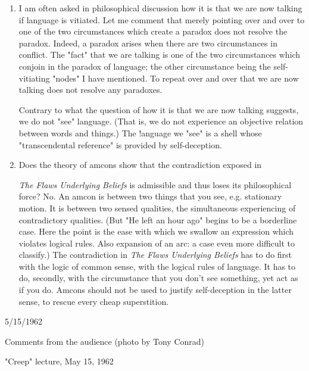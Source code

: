 \documentclass[10pt,twoside,draft]{memoir}
\newcommand{\essaytitle}[1]{
	\emph{#1}}
\begin{document}
\begin{enumerate}
At first this suggestion may seem like another joke, a triviality. But my 
genius consists in recognizing that it is not, that there is a residue of 
non-vacuity and non-triviality in this proposal. There may be only a 
hair's-breadth of difference between the state I propose and mental 
incompetance or death---but still, there is all of a hair's-breadth. I magnify 
this hair's-breadth many times, and use it as a lever to overturn civilization. 

\item I am often asked in philosophical discussion how it is that we are 
now talking if language is vitiated. Let me comment that merely pointing 
over and over to one of the two circumstances which create a paradox does 
not resolve the paradox. Indeed, a paradox arises when there are two 
circumstances in conflict. The "fact" that we are talking is one of the two 
circumstances which conjoin in the paradox of language; the other 
circumstance being the self-vitiating "nodes" I have mentioned. To repeat 
over and over that we are now talking does not resolve any paradoxes. 

Contrary to what the question of how it is that we are now talking 
suggests, we do not "see" language. (That is, we do not experience an 
objective relation between words and things.) The !anguage we "see" is a 
shell whose "transcendental reference" is provided by self-deception. 

\item Does the theory of amcons show that the contradiction exposed in 
\essaytitle{The Flaws Underlying Beliefs} is admissible and thus loses its philosophical 
force? No. An amcon is between two things that you see, e.g. stationary 
motion. It is between two sensed qualities, the simultaneous experiencing of 
contradictory qualities. (But "He left an hour ago" begins to be a borderline 
case. Here the point is the ease with which we swallow an expression which 
violates logical rules. Also expansion of an arc: a case even more difficult to 
classify.) The contradiction in \essaytitle{The Flaws Underlying Beliefs} has to do first 
with the logic of common sense, with the logical rules of language. It has to 
do, secondly, with the circumstance that you don't see something, yet act as 
if you do. Amcons should not be used to justify self-deception in the latter 
sense, to rescue every cheap superstition. 
\end{enumerate}


{
5/15/1962 


Comments from the audience 
(photo by Tony Conrad) 


"Creep" lecture, May 15, 1962 
}
\end{document}
